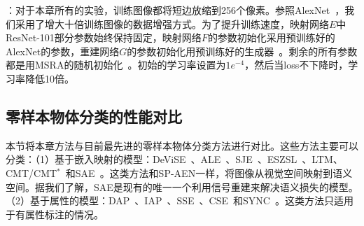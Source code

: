 ：对于本章所有的实验，训练图像都将短边放缩到256个像素。参照AlexNet~\cite{krizhevsky2012imagenet}，我们采用了增大十倍训练图像的数据增强方式。为了提升训练速度，映射网络$E$中ResNet-101部分参数始终保持固定，映射网络$F$的参数初始化采用预训练好的AlexNet的参数，重建网络$G$的参数初始化用预训练好的生成器~\cite{dosovitskiy2016generating}。剩余的所有参数都是用MSRA的随机初始化~\cite{he2015delving}。初始的学习率设置为$1e^{-4}$，然后当loss不下降时，学习率降低10倍。


\subsection{零样本物体分类的性能对比}
本节将本章方法与目前最先进的零样本物体分类方法进行对比。这些方法主要可以分类：（1）基于嵌入映射的模型：DeViSE~\cite{frome2013devise}、ALE~\cite{akata2015label}、SJE~\cite{akata2015evaluation}、ESZSL~\cite{romera2015embarrassingly}、LTM\cite{xian2016latent}、CMT/CMT$^*$~\cite{socher2013zero}和SAE~\cite{kodirov2017semantic}。这类方法和SP-AEN一样，将图像从视觉空间映射到语义空间。据我们了解，SAE是现有的唯一一个利用信号重建来解决语义损失的模型。（2）基于属性的模型：DAP~\cite{lampert2009learning}、IAP~\cite{lampert2009learning}、SSE~\cite{zhang2015zero}、CSE~\cite{norouzi2014zero}和SYNC~\cite{changpinyo2016synthesized}。这类方法只适用于有属性标注的情况。

